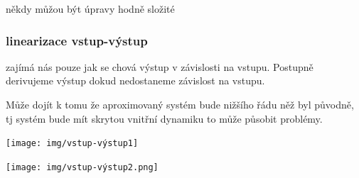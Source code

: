 někdy můžou být úpravy hodně složité

\subsubsection{linearizace vstup-výstup}
zajímá nás pouze jak se chová výstup v závislosti na vstupu. Postupně derivujeme výstup dokud nedostaneme závislost na vstupu.

Může dojít k tomu že aproximovaný systém bude nižšího řádu něž byl původně, tj systém bude mít skrytou vnitřní dynamiku to může působit problémy.

\texttt{[image: img/vstup-výstup1]}

\texttt{[image: img/vstup-výstup2.png]}


